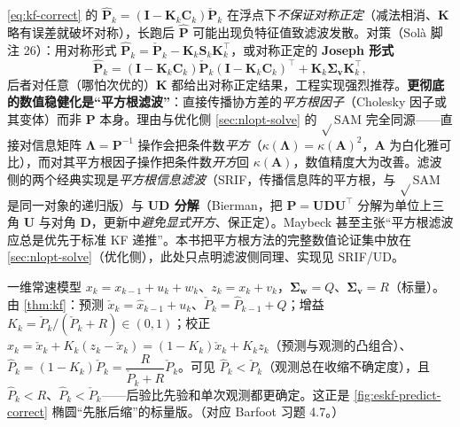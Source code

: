 \begin{pitfall}
\cref{eq:kf-correct} 的 $\hat{\mathbf{P}}_k=(\mathbf{I}-\mathbf{K}_k\mathbf{C}_k)\check{\mathbf{P}}_k$ 在浮点下\emph{不保证对称正定}（减法相消、$\mathbf{K}$ 略有误差就破坏对称），长跑后 $\hat{\mathbf{P}}$ 可能出现负特征值致滤波发散。对策（Solà\cite{sola2017quaternion} 脚注 26）：用对称形式 $\hat{\mathbf{P}}_k=\check{\mathbf{P}}_k-\mathbf{K}_k\mathbf{S}_k\mathbf{K}_k^\top$，或对称正定的 \textbf{Joseph 形式}
\[
  \hat{\mathbf{P}}_k=(\mathbf{I}-\mathbf{K}_k\mathbf{C}_k)\check{\mathbf{P}}_k(\mathbf{I}-\mathbf{K}_k\mathbf{C}_k)^\top+\mathbf{K}_k\boldsymbol{\Sigma}_{\mathbf{v}}\mathbf{K}_k^\top,
\]
后者对任意（哪怕次优的）$\mathbf{K}$ 都给出对称正定结果，工程实现强烈推荐。\textbf{更彻底的数值稳健化是“平方根滤波”}：直接传播协方差的\emph{平方根因子}（Cholesky 因子或其变体）而非 $\mathbf{P}$ 本身。理由与优化侧 \cref{sec:nlopt-solve} 的 $\sqrt{}$SAM 完全同源——直接对信息矩阵 $\boldsymbol{\Lambda}=\mathbf{P}^{-1}$ 操作会把条件数\emph{平方}（$\kappa(\boldsymbol{\Lambda})=\kappa(\mathbf{A})^2$，$\mathbf{A}$ 为白化雅可比），而对其平方根因子操作把条件数\emph{开方}回 $\kappa(\mathbf{A})$，数值精度大为改善。滤波侧的两个经典实现是\emph{平方根信息滤波}（SRIF，传播信息阵的平方根，与 $\sqrt{}$SAM 是同一对象的递归版）与 \textbf{UD 分解}（Bierman，把 $\mathbf{P}=\mathbf{U}\mathbf{D}\mathbf{U}^\top$ 分解为单位上三角 $\mathbf{U}$ 与对角 $\mathbf{D}$，更新中\emph{避免显式开方}、保正定）。Maybeck 甚至主张“平方根滤波应总是优先于标准 KF 递推”。本书把平方根方法的完整数值论证集中放在 \cref{sec:nlopt-solve}（优化侧），此处只点明滤波侧同理、实现见 SRIF/UD。
\end{pitfall}

\begin{example}[一维定位的两步 KF 手算]\label{ex:kf-1d}
一维常速模型 $x_k=x_{k-1}+u_k+w_k$、$z_k=x_k+v_k$，$\boldsymbol{\Sigma}_{\mathbf{w}}=Q$、$\boldsymbol{\Sigma}_{\mathbf{v}}=R$（标量）。由 \cref{thm:kf}：预测 $\check{x}_k=\hat{x}_{k-1}+u_k$、$\check{P}_k=\hat{P}_{k-1}+Q$；增益 $K_k=\check{P}_k/(\check{P}_k+R)\in(0,1)$；校正 $\hat{x}_k=\check{x}_k+K_k(z_k-\check{x}_k)=(1-K_k)\check{x}_k+K_k z_k$（预测与观测的凸组合）、$\hat{P}_k=(1-K_k)\check{P}_k=\dfrac{R}{\check{P}_k+R}\check{P}_k$。可见 $\hat{P}_k<\check{P}_k$（观测总在收缩不确定度），且 $\hat{P}_k<R$、$\hat{P}_k<\check{P}_k$——后验比先验和单次观测都更确定。这正是 \cref{fig:eskf-predict-correct} 椭圆“先胀后缩”的标量版。（对应 Barfoot 习题 4.7。）
\end{example}

